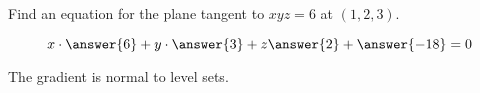 \documentclass{ximera}
\author{David Guichard \and Neal Koblitz \and H. Jerome Keisler \and Albert Scheller \and Barry Balof \and Mike Wills \and Matthew Carr \and Bart Snapp}
\begin{document}
\begin{exercise}
Find an equation for the plane tangent to $xyz=6$ at $(1,2,3)$.

\begin{prompt}
\[
x\cdot \answer{6} + y\cdot \answer{3} + z\answer{2} + \answer{-18}=0
\]
\end{prompt}

\begin{hint}
  The gradient is normal to level sets.
\end{hint}

\end{exercise}
\end{document}
